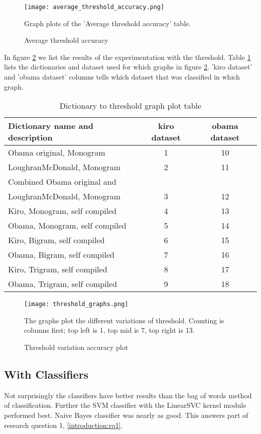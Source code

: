 \begin{figure}[htb]
    \centering
    \texttt{[image: average\_threshold\_accuracy.png]}
    \label{fig:average_threshold_accuracy}
    \caption{Average threshold accuracy}
Graph plots of the 'Average threshold accuracy' table.
\end{figure}

In figure \ref{fig:threshold_graphs} we list the results of the experimentation
with the threshold. Table \ref{tbl:dictionary_to_threshold} lists the
dictionaries and dataset used for which graphs in figure
\ref{fig:threshold_graphs}.
'kiro dataset' and 'obama dataset' columns tells which dataset that was
classified in which graph.

\begin{table}
\centering
\label{tbl:dictionary_to_threshold}
\caption{Dictionary to threshold graph plot table}
\begin{tabular}{ l c c }
Dictionary name and description & kiro dataset & obama dataset \\
\hline
Obama original, Monogram & 1 & 10 \\
LoughranMcDonald, Monogram & 2 & 11 \\
Combined Obama original and \\ LoughranMcDonald, Monogram & 3 & 12 \\
Kiro, Monogram, self compiled & 4 & 13 \\
Obama, Monogram, self compiled & 5 & 14 \\
Kiro, Bigram, self compiled & 6 & 15 \\
Obama, Bigram, self compiled & 7 & 16 \\
Kiro, Trigram, self compiled & 8 & 17 \\
Obama, Trigram, self compiled & 9 & 18 \\
\end{tabular}
\end{table}

\begin{figure}[htb]
    \centering
    \texttt{[image: threshold\_graphs.png]}
    \label{fig:threshold_graphs}
    \caption{Threshold variation accuracy plot}
The graphs plot the different variations of threshold. Counting is
columns first; top left is 1, top mid is 7, top right is 13.
\end{figure}

\subsection{With Classifiers}
Not surprisingly the classifiers have better results than the bag of words
method of classification. Further the SVM classifier with the LinearSVC kernel
module performed best. Naive Bayes classifier was nearly as good. This answers
part of research question 1, \ref{introduction:rq1}.


